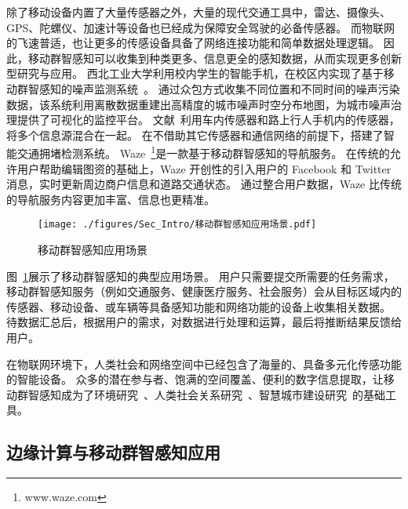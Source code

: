除了移动设备内置了大量传感器之外，大量的现代交通工具中，雷达、摄像头、GPS、陀螺仪、加速计等设备也已经成为保障安全驾驶的必备传感器。
而物联网的飞速普适，也让更多的传感设备具备了网络连接功能和简单数据处理逻辑。
因此，移动群智感知可以收集到种类更多、信息更全的感知数据，从而实现更多创新型研究与应用。
西北工业大学利用校内学生的智能手机，在校区内实现了基于移动群智感知的噪声监测系统~\cite{CNKI/2014/CSNSYu}。
通过众包方式收集不同位置和不同时间的噪声污染数据，该系统利用离散数据重建出高精度的城市噪声时空分布地图，为城市噪声治理提供了可视化的监控平台。
文献~\cite{DBLP:conf/wcnc/AliAEJH12}利用车内传感器和路上行人手机内的传感器，将多个信息源混合在一起。
在不借助其它传感器和通信网络的前提下，搭建了智能交通拥堵检测系统。
Waze~\footnote{www.waze.com}是一款基于移动群智感知的导航服务。
在传统的允许用户帮助编辑图资的基础上，Waze 开创性的引入用户的 Facebook 和 Twitter 消息，实时更新周边商户信息和道路交通状态。
通过整合用户数据，Waze 比传统的导航服务内容更加丰富、信息也更精准。

\begin{figure}[!h]
  \centering
  \texttt{[image: ./figures/Sec\_Intro/移动群智感知应用场景.pdf]}
  \vspace{-0.5em}
  \caption{移动群智感知应用场景}
  \label{Figure_MCS_Application}
\end{figure}

图~\ref{Figure_MCS_Application}展示了移动群智感知的典型应用场景。
用户只需要提交所需要的任务需求，移动群智感知服务（例如交通服务、健康医疗服务、社会服务）会从目标区域内的传感器、移动设备、或车辆等具备感知功能和网络功能的设备上收集相关数据。
待数据汇总后，根据用户的需求，对数据进行处理和运算，最后将推断结果反馈给用户。

在物联网环境下，人类社会和网络空间中已经包含了海量的、具备多元化传感功能的智能设备。
众多的潜在参与者、饱满的空间覆盖、便利的数字信息提取，让移动群智感知成为了环境研究~\cite{DBLP:conf/sensys/DuttaAKMMWW09}、人类社会关系研究~\cite{DBLP:conf/globecom/AslIAM13}、智慧城市建设研究~\cite{DBLP:journals/cm/WangZWCHM16}的基础工具。

\subsection{边缘计算与移动群智感知应用}

